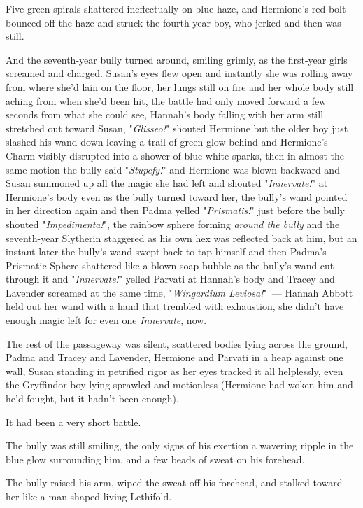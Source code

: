 Five green spirals shattered ineffectually on blue haze, and Hermione's red
bolt bounced off the haze and struck the fourth-year boy, who jerked and then
was still.

And the seventh-year bully turned around, smiling grimly, as the first-year
girls screamed and charged.
\sbreak
Susan's eyes flew open and instantly she was rolling away from where she'd lain
on the floor, her lungs still on fire and her whole body still aching from when
she'd been hit, the battle had only moved forward a few seconds from what she
could see, Hannah's body falling with her arm still stretched out toward Susan,
"\emph{Glisseo!}" shouted Hermione but the older boy just slashed his wand down
leaving a trail of green glow behind and Hermione's Charm visibly disrupted
into a shower of blue-white sparks, then in almost the same motion the bully
said "\emph{Stupefy!}" and Hermione was blown backward and Susan summoned up
all the magic she had left and shouted "\emph{Innervate!}" at Hermione's body
even as the bully turned toward her, the bully's wand pointed in her direction
again and then Padma yelled "\emph{Prismatis!}" just before the bully shouted
"\emph{Impedimenta!}", the rainbow sphere forming \emph{around the bully} and
the seventh-year Slytherin staggered as his own hex was reflected back at him,
but an instant later the bully's wand swept back to tap himself and then
Padma's Prismatic Sphere shattered like a blown soap bubble as the bully's wand
cut through it and "\emph{Innervate!}" yelled Parvati at Hannah's body and
Tracey and Lavender screamed at the same time, "\emph{Wingardium Leviosa!}"~---
\sbreak
Hannah Abbott held out her wand with a hand that trembled with exhaustion, she
didn't have enough magic left for even one \emph{Innervate}, now.

The rest of the passageway was silent, scattered bodies lying across the
ground, Padma and Tracey and Lavender, Hermione and Parvati in a heap against
one wall, Susan standing in petrified rigor as her eyes tracked it all
helplessly, even the Gryffindor boy lying sprawled and motionless (Hermione had
woken him and he'd fought, but it hadn't been enough).

It had been a very short battle.

The bully was still smiling, the only signs of his exertion a wavering ripple
in the blue glow surrounding him, and a few beads of sweat on his forehead.

The bully raised his arm, wiped the sweat off his forehead, and stalked toward
her like a man-shaped living Lethifold.

